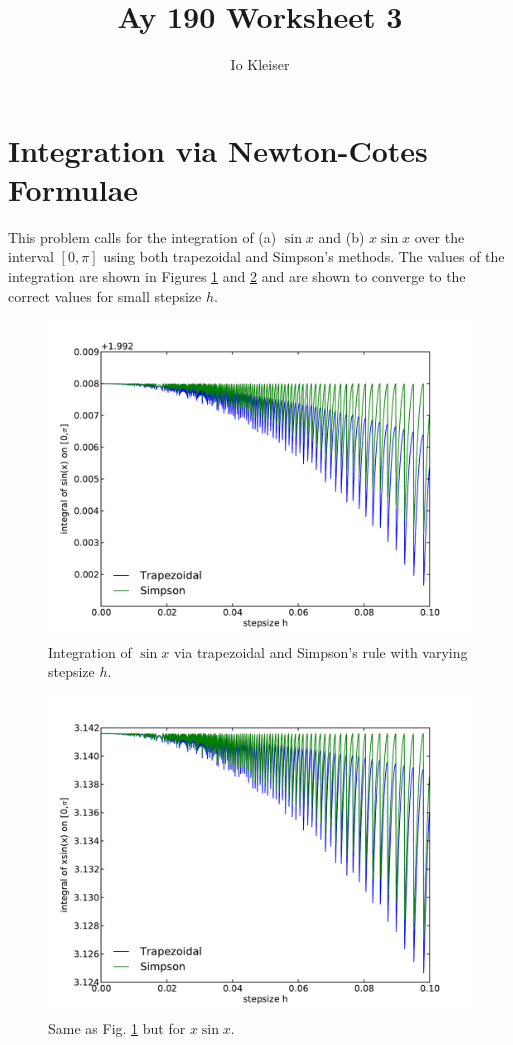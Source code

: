\documentclass[12pt,preprint]{aastex}
\begin{document}

\title {Ay 190 Worksheet 3} 

\author{Io Kleiser}  

\section{Integration via Newton-Cotes Formulae}
This problem calls for the integration of (a) $\sin x$ and (b) $x \sin x$ over the interval $[0,\pi]$ using both trapezoidal and Simpson's methods. The values of the integration are shown in Figures \ref{f:trapsimp_sinx} and \ref{f:trapsimp_xsinx} and are shown to converge to the correct values for small stepsize $h$.

\begin{figure}[!ht]
\begin{center}
\includegraphics[width=6in]{trapsimp_sinx.pdf}
\end{center}
\caption{Integration of $\sin x$ via trapezoidal and Simpson's rule with varying stepsize $h$. \label{f:trapsimp_sinx}}
\end{figure}

\begin{figure}[!ht]
\begin{center}
\includegraphics[width=6in]{trapsimp_xsinx.pdf}
\end{center}
\caption{Same as Fig. \ref{f:trapsimp_sinx} but for $x \sin x$. \label{f:trapsimp_xsinx}}
\end{figure}

% 
%

%
\end{document}
